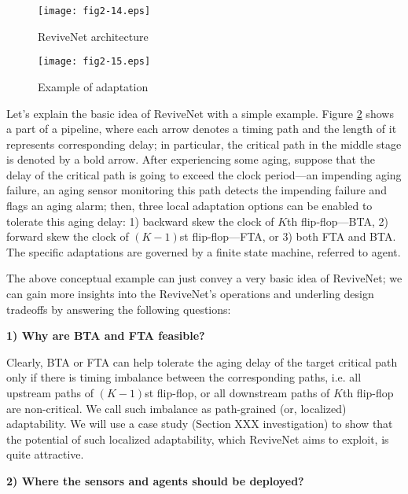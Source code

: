 \begin{figure}[t]
\centering
\texttt{[image: fig2-14.eps]}%
   \caption{ReviveNet architecture}\label{syntop}
\end{figure}

\begin{figure}[h]
 \centering
  \texttt{[image: fig2-15.eps]}%
  \caption{Example of adaptation}\label{ba_fa}
\end{figure}

Let's explain the basic idea of ReviveNet with a simple example. Figure \ref{ba_fa} shows a part of a pipeline, where each arrow denotes a timing path and the length of it represents corresponding delay; in particular, the critical path in the middle stage is denoted by a bold arrow. After experiencing some aging, suppose that the delay of the critical path is going to exceed the clock period---an impending aging failure, an aging sensor monitoring this path detects the impending failure \cite{failure_prediction_07}\cite{SVFD_09} and flags an aging alarm; then, three local adaptation options can be enabled to tolerate this aging delay: 1) backward skew the clock of $K$th flip-flop---BTA, 2) forward skew the clock of $(K-1)$st flip-flop---FTA, or 3) both FTA and BTA. The specific adaptations are governed by a finite state machine, referred to agent.

The above conceptual example can just convey a very basic idea of ReviveNet; we can gain more insights into the ReviveNet's operations and underling design tradeoffs by answering the following questions:

{\bf 1) Why are BTA and FTA feasible?}

Clearly, BTA or FTA can help tolerate the aging delay of the target critical path only if there is timing imbalance between the corresponding paths, i.e. all upstream paths of $(K-1)$st flip-flop, or all downstream paths of $K$th flip-flop are non-critical. We call such imbalance as path-grained (or, localized) adaptability. We will use a case study (Section XXX investigation) to show that the potential of such localized adaptability, which ReviveNet aims to exploit, is quite attractive.

{\bf 2) Where the sensors and agents should be deployed?}

